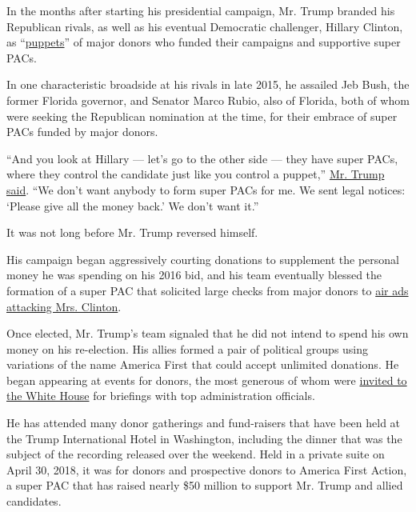 In the months after starting his presidential campaign, Mr. Trump
branded his Republican rivals, as well as his eventual Democratic
challenger, Hillary Clinton, as
``\href{https://twitter.com/realDonaldTrump/status/627841345789558788}{puppets}''
of major donors who funded their campaigns and supportive super PACs.

In one characteristic broadside at his rivals in late 2015, he assailed
Jeb Bush, the former Florida governor, and Senator Marco Rubio, also of
Florida, both of whom were seeking the Republican nomination at the
time, for their embrace of super PACs funded by major donors.

``And you look at Hillary --- let's go to the other side --- they have
super PACs, where they control the candidate just like you control a
puppet,''
\href{https://www.politico.com/story/2015/11/donald-trump-sheldon-adelson-paul-singer-koch-brothers-215540}{Mr.
Trump said}. ``We don't want anybody to form super PACs for me. We sent
legal notices: `Please give all the money back.' We don't want it.''

It was not long before Mr. Trump reversed himself.

His campaign began aggressively courting donations to supplement the
personal money he was spending on his 2016 bid, and his team eventually
blessed the formation of a super PAC that solicited large checks from
major donors to
\href{https://www.nytimes.com/2016/06/08/us/politics/super-pac-supporting-donald-trump-makes-first-ad-buy-for-general-election.html}{air
ads attacking Mrs. Clinton}.

Once elected, Mr. Trump's team signaled that he did not intend to spend
his own money on his re-election. His allies formed a pair of political
groups using variations of the name America First that could accept
unlimited donations. He began appearing at events for donors, the most
generous of whom were
\href{https://www.politico.com/story/2017/06/14/trump-donors-comey-testimony-239570}{invited
to the White House} for briefings with top administration officials.

He has attended many donor gatherings and fund-raisers that have been
held at the Trump International Hotel in Washington, including the
dinner that was the subject of the recording released over the weekend.
Held in a private suite on April 30, 2018, it was for donors and
prospective donors to America First Action, a super PAC that has raised
nearly \$50 million to support Mr. Trump and allied candidates.

